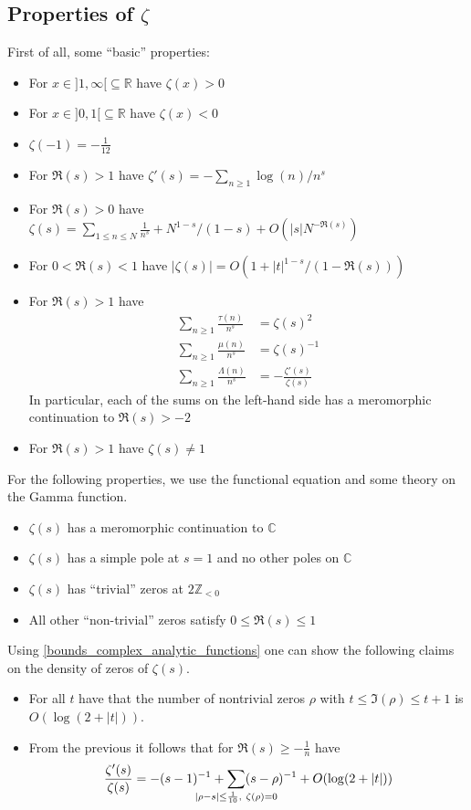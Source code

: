 \documentclass{scrartcl}
\newcommand{\R}{\mathbb{R}}
\newcommand{\Z}{\mathbb{Z}}
\newcommand{\C}{\mathbb{C}}
\begin{document}
\subsection{Properties of $\zeta$}
First of all, some ``basic'' properties:
\begin{itemize}
    \item For $x \in ]1, \infty[ \subseteq \R$ have $\zeta(x) > 0$
    \item For $x \in ]0, 1[ \subseteq \R$ have $\zeta(x) < 0$
    \item $\zeta(-1) = -\frac 1 {12}$
    \item For $\Re(s) > 1$ have $\zeta'(s) = -\sum_{n \geq 1} \log(n)/n^s$
    \item For $\Re(s) > 0$ have $\zeta(s) = \sum_{1 \leq n \leq N} \frac 1 {n^s} + N^{1 - s}/(1 - s) + O(|s| N^{-\Re(s)})$
    \item For $0 < \Re(s) < 1$ have $|\zeta(s)| = O(1 + |t|^{1 - s}/(1 - \Re(s)))$
    \item For $\Re(s) > 1$ have
    \begin{align*}
        \sum_{n \geq 1} \frac {\tau(n)} {n^s} &= \zeta(s)^2 \\
        \sum_{n \geq 1} \frac {\mu(n)} {n^s} &= \zeta(s)^{-1} \\
        \sum_{n \geq 1} \frac {\Lambda(n)} {n^s} &= -\frac {\zeta'(s)} {\zeta(s)}
    \end{align*}
    In particular, each of the sums on the left-hand side has a meromorphic continuation to $\Re(s) > -2$
    \item For $\Re(s) > 1$ have $\zeta(s) \neq 1$
\end{itemize}
For the following properties, we use the functional equation and some theory on the Gamma function.
\begin{itemize}
    \item $\zeta(s)$ has a meromorphic continuation to $\C$
    \item $\zeta(s)$ has a simple pole at $s = 1$ and no other poles on $\C$
    \item $\zeta(s)$ has ``trivial'' zeros at $2\Z_{< 0}$
    \item All other ``non-trivial'' zeros satisfy $0 \leq \Re(s) \leq 1$
\end{itemize}
Using \ref{bounds_complex_analytic_functions} one can show the following claims on the density of zeros of $\zeta(s)$.
\begin{itemize}
    \item For all $t$ have that the number of nontrivial zeros $\rho$ with $t \leq \Im(\rho) \leq t + 1$ is $O(\log(2 + |t|))$.
    \item From the previous it follows that for $\Re(s) \geq -\frac 1 n$ have
    \begin{equation*}
        \frac {\zeta'(s)} {\zeta(s)} = -(s - 1)^{-1} + \sum_{\mathclap{|\rho - s| \leq \frac 1 {10}, \ \zeta(\rho) = 0}} (s - \rho)^{-1} + O(\log(2 + |t|))
    \end{equation*}
\end{itemize}
\end{document}
